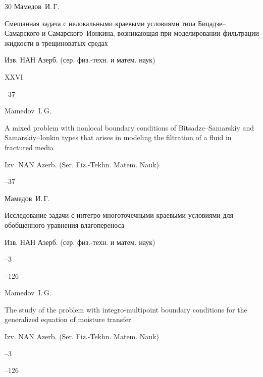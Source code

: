 \begin{thebibliography}{30}
\by Мамедов~И.\,Г.

\paper Смешанная задача с нелокальными краевыми условиями типа Бицадзе--Самарского и Самарского--Ионкина, возникающая при моделировании фильтрации жидкости в трещиноватых средах

\jour Изв. НАН Азерб. (сер. физ.-техн. и матем. наук)


\vol XXVI


--37

\misctransl

\by Mamedov~I.\,G. 

\paper A mixed problem with nonlocal boundary conditions of Bitsadze--Samarskiy and Samarskiy--Ionkin types that arises in modeling the filtration of a fluid in fractured media

\jour Izv. NAN Azerb. (Ser. Fiz.-Tekhn. Matem. Nauk)




–37



\pagebreak






\by Мамедов~И.\,Г.

\paper Исследование задачи с интегро-многоточечными краевыми условиями для обобщенного уравнения влагопереноса

\jour Изв. НАН Азерб. (сер. физ.-техн. и матем. наук)



--3

--126

\misctransl 

\by Mamedov~I.\,G. 

\paper The study of the problem with integro-multipoint boundary conditions for the generalized equation of moisture transfer

\jour Izv. NAN Azerb. (Ser. Fiz.-Tekhn. Matem. Nauk)



--3

--126



\end{thebibliography}






